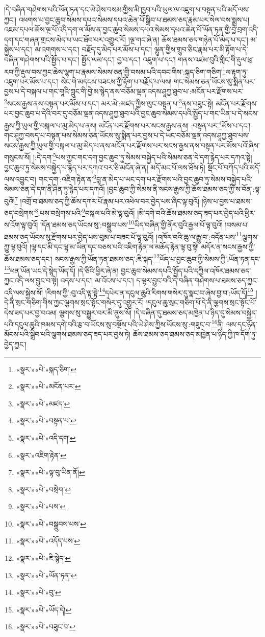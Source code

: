 །དེ་བཞིན་གཤེགས་པའི་ཡོན་ཏན་དང་ཡེ་ཤེས་བསམ་གྱིས་མི་ཁྱབ་པའི་ཡུལ་ལ་འཇུག་པ་བསྟན་པའི་མདོ་ལས་ཀྱང་། འཕགས་པ་བྱང་ཆུབ་སེམས་དཔའ་སེམས་དཔའ་ཆེན་པོ་སྒྲིབ་པ་ཐམས་ཅད་རྣམ་པར་སེལ་བས་སྨྲས་པ། འཇམ་དཔལ་ཆོས་ལྔ་པོ་འདི་དག་ལ་མོས་ན་བྱང་ཆུབ་སེམས་དཔའ་སེམས་དཔའ་ཆེན་པོ་ཡོན་ཏན་གྱི་བྱེ་བྲག་འདི་དག་དང་གཞན་གྲངས་མེད་པ་ཡང་ཐོབ་པར་འགྱུར་རོ། །ལྔ་གང་ཞེ་ན། ཆོས་ཐམས་ཅད་གཉེན་པོ་མེད་པ་དང་། མ་སྐྱེས་པ་དང་། མ་འགགས་པ་དང་། བརྗོད་དུ་མེད་པར་མོས་པ་དང་། ལྷུན་གྱིས་གྲུབ་ཅིང་རྣམ་པར་མི་རྟོག་པ་དེ་བཞིན་གཤེགས་པའི་སྤྱོད་པ་དང་། སྤྱོད་ལམ་དང་། བྱ་བ་དང་། འཇུག་པ་དང་། གནས་འཛམ་བུའི་གླིང་གི་རྡུལ་ཕྲ་རབ་ཀྱི་རྡུལ་བས་ཀྱང་ཆེས་ལྷག་པ་རྣམས་སེམས་ཅན་གྱི་བསམ་པའི་དབང་གིས་:སྐད་ཅིག་གཅིག་\footnote{«སྣར་»«པེ་»སྐད་ཅིག་}ལ་རྟག་ཏུ་འཇུག་པར་མོས་པ་དང་། སེང་གེ་མདངས་བཟངས་ཀྱི་རྟོག་པ་བརྗོད་པ་ལས། གང་སེམས་ཅན་ཡོངས་སུ་སྨིན་པར་བྱས་པ་དེ་བསྐལ་པ་གང་གཱའི་ཀླུང་གི་བྱེ་མ་སྙེད་ནས་བཅོམ་ལྡན་འདས་ཤཱཀྱ་ཐུབ་པ་:མངོན་པར་རྫོགས་པར་\footnote{«སྣར་»«པེ་»མངོན་པར་}སངས་རྒྱས་ནས་བསྟན་པར་མོས་པ་དང་། མར་མེ་:མཛད་ཀྱིས་ལུང་བསྟན་པ་\footnote{«སྣར་»«པེ་»མཛད་}ནས་བཟུང་སྟེ། མངོན་པར་རྫོགས་པར་བྱང་ཆུབ་པ་དེའི་བར་དུ་བཅོམ་ལྡན་འདས་ཤཱཀྱ་ཐུབ་པའི་བྱང་ཆུབ་སེམས་དཔའི་སྤྱོད་པ་གང་ཡིན་པ་དེ་སངས་རྒྱས་ཀྱི་ཡུལ་གྱི་བསྐལ་པ་མུ་མེད་པ་ནས། མངོན་པར་རྫོགས་པར་སངས་རྒྱས་ནས། :བསྟན་པར་\footnote{«སྣར་»«པེ་»བསྟན་པ་}མོས་པ་དང་། གང་ཤཱཀྱ་བསད་པ་བསྟན་པས་སེམས་ཅན་ཡོངས་སུ་སྨིན་པར་བྱས་པ་དེ་ཡང་བཅོམ་ལྡན་འདས་ཤཱཀྱ་ཐུབ་པས་སངས་རྒྱས་ཀྱི་ཡུལ་གྱི་བསྐལ་པ་མུ་མེད་པ་ནས་མངོན་པར་རྫོགས་པར་སངས་རྒྱས་ནས་བསྟན་པར་མོས་པའོ་ཞེས་གསུངས་སོ། །:དེ་དག་\footnote{«སྣར་»«པེ་»འདི་དག་}པས་ཀྱང་གང་དག་བྱང་ཆུབ་ཏུ་སེམས་བསྐྱེད་པའི་སེམས་ཅན་དེ་དག་རྙེད་པར་དཀའ་སྟེ། བྱང་ཆུབ་ཏུ་སེམས་བསྐྱེད་པ་རྙེད་པར་དཀའ་བར་ཅི་མངོན་ཞེ་ན། མདོ་མང་པོ་ལས་ཐོས་ཏེ། སྡོང་པོ་བཀོད་པའི་མདོ་ལས་འབྱུང་བ། གང་དག་:འཇིག་རྟེན་ན་\footnote{«སྣར་»འཇིག་རྟེན་}བླ་ན་མེད་པ་ཡང་དག་པར་རྫོགས་པའི་བྱང་ཆུབ་ཏུ་སེམས་བསྐྱེད་པའི་སེམས་ཅན་དེ་དག་ནི་ཤིན་ཏུ་རྙེད་པར་དཀའོ། །བྱང་ཆུབ་ཀྱི་སེམས་ནི་སངས་རྒྱས་ཀྱི་ཆོས་ཐམས་ཅད་ཀྱི་ས་བོན་:ལྟ་བུའོ།\footnote{«སྣར་»«པེ་»ལྟ་བུ་ཡིན་ནོ།} །འགྲོ་བ་ཐམས་ཅད་ཀྱི་ཆོས་དཀར་པོ་རྣམ་པར་འཕེལ་བར་བྱེད་པས་ཞིང་ལྟ་བུའོ། །ཉེས་པ་བྱས་པ་ཐམས་ཅད་བསྲེགས་\footnote{«སྣར་»«པེ་»བསྲེག་}:པས་བསྲེགས་པའི་\footnote{«སྣར་»«པེ་»པས་}བསྐལ་པའི་མེ་ལྟ་བུའོ། །མི་དགེ་བའི་ཆོས་ཐམས་ཅད་ཟད་པར་བྱེད་པའི་ཕྱིར་ས་འོག་ལྟ་བུའོ། །དོན་ཐམས་ཅད་ཡོངས་སུ་:བསྒྲུབ་པས་\footnote{«སྣར་»«པེ་»བསྒྲུབས་པས་}ཡིད་བཞིན་གྱི་ནོར་བུའི་རྒྱལ་པོ་ལྟ་བུའོ། །བསམ་པ་ཐམས་ཅད་ཡོངས་སུ་རྫོགས་པར་བྱེད་པས་བུམ་པ་བཟང་པོ་ལྟ་བུའོ། །འཁོར་བའི་ཆུ་ལ་རྒྱུ་བ་:འདོན་པས་\footnote{«སྣར་»«པེ་»འདོད་པས་}ལྕགས་ཀྱུ་ལྟ་བུའོ། །ལྷ་དང་མི་དང་ལྷ་མ་ཡིན་དང་བཅས་པའི་འཇིག་རྟེན་ལ་མཆོད་རྟེན་ལྟ་བུ་སྟེ། མདོར་ན་སངས་རྒྱས་ཀྱི་ཆོས་ཐམས་ཅད་དང་། སངས་རྒྱས་ཀྱི་ཡོན་ཏན་ཐམས་ཅད་:ཇི་སྐད་\footnote{«སྣར་»«པེ་»ཇི་སྙེད་}ཡོད་པ་བྱང་ཆུབ་ཀྱི་སེམས་ཀྱི་:ཡོན་ཏན་དང་\footnote{«སྣར་»«པེ་»ཡོན་ཏན་}ཕན་ཡོན་ཡང་དེ་སྙེད་ཡོད་དོ། །དེ་ཅིའི་ཕྱིར་ཞེ་ན། བྱང་ཆུབ་སེམས་དཔའི་སྤྱོད་པའི་དཀྱིལ་འཁོར་ཐམས་ཅད་ཀྱང་འདི་ལས་བྱུང་བ་སྟེ། འདས་པ་དང་། མ་འོངས་པ་དང་། ད་ལྟར་བྱུང་བའི་དེ་བཞིན་གཤེགས་པ་ཐམས་ཅད་ཀྱང་འདི་ལས་སྐྱེས་སོ། །རིགས་ཀྱི་:བུ་འདི་ལྟ་སྟེ་\footnote{«སྣར་»«པེ་»བུ་}དཔེར་ན་དངུལ་ཆུའི་རིགས་གསེར་དུ་སྣང་བ་ཞེས་བྱ་བ་:ཡོད་དོ།\footnote{«སྣར་»«པེ་»ཡོད་དེ།} །དེ་ནི་སྲང་གཅིག་གིས་ཀྱང་ལྕགས་སྲང་སྟོང་གསེར་དུ་འགྱུར་རོ། །དངུལ་ཆུ་སྲང་གཅིག་པོ་དེ་ནི་ལྕགས་སྲང་སྟོང་པོ་དེས་ཟད་པར་བྱ་བའམ། ལྕགས་སུ་བསྒྱུར་བར་མི་ནུས་སོ། །དེ་བཞིན་དུ་ཐམས་ཅད་མཁྱེན་པ་ཉིད་དུ་སེམས་བསྐྱེད་པའི་དངུལ་ཆུའི་ཁམས་དགེ་བའི་རྩ་བ་ཡོངས་སུ་བསྔོས་པའི་ཡེ་ཤེས་ཀྱིས་ཡོངས་སུ་:གཟུང་བ་\footnote{«སྣར་»«པེ་»བཟུང་བ་}ནི། ལས་དང་ཉོན་མོངས་པའི་སྒྲིབ་པའི་ལྕགས་ཐམས་ཅད་ཟད་པར་བྱས་ཏེ། ཆོས་ཐམས་ཅད་ཐམས་ཅད་མཁྱེན་པ་ཉིད་ཀྱི་ཁ་དོག་ཏུ་བྱེད་ཀྱང་། 